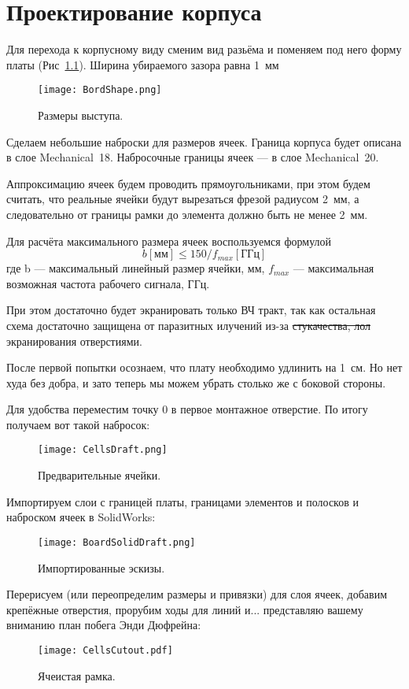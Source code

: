 \chapter{Проектирование корпуса}

Для перехода к корпусному виду сменим вид разьёма и поменяем под него форму платы (Рис~\ref{fig:BordShape}). Ширина убираемого зазора равна 1~мм

\begin{figure}[H]
	\centering
	\texttt{[image: BordShape.png]}
	\caption{Размеры выступа.}%
	\label{fig:BordShape}
\end{figure}

Сделаем небольшие наброски для размеров ячеек. 
Граница корпуса будет описана в слое Mechanical~18. Набросочные границы ячеек — в слое Mechanical~20.

Аппроксимацию ячеек будем проводить прямоугольниками, при этом будем считать, что реальные ячейки будут вырезаться фрезой радиусом 2~мм, а следовательно от границы рамки до элемента должно быть не менее 2~мм.

Для расчёта максимального размера ячеек воспользуемся формулой
\[b[\text{мм}]\leq150/f_{max}[\text{ГГц}]\]
где  b  ---  максимальный  линейный  размер  ячейки,  мм, $f_{max}$ ---  максимальная возможная частота рабочего сигнала, ГГц.

При этом достаточно будет экранировать только ВЧ тракт, так как остальная схема достаточно защищена от паразитных илучений из-за \sout{стукачества, лол} экранирования отверстиями. 

После первой попытки осознаем, что плату необходимо удлинить на 1~см. Но нет худа без добра, и зато теперь  мы можем убрать столько же с боковой стороны.

Для удобства переместим точку 0 в первое монтажное отверстие.
По итогу получаем вот такой набросок:
\begin{figure}[H]
	\centering
	\texttt{[image: CellsDraft.png]}
	\caption{Предварительные ячейки.}%
	\label{fig:CellsDraft}
\end{figure}

Импортируем слои с границей платы, границами элементов и полосков и наброском ячеек в SolidWorks:
\begin{figure}[H]
	\centering
	\texttt{[image: BoardSolidDraft.png]}
	\caption{Импортированные эскизы.}%
	\label{fig:BoardSolidDraft}
\end{figure}

Перерисуем (или переопределим размеры и привязки) для слоя ячеек, добавим крепёжные отверстия, прорубим ходы для линий и...  представляю вашему вниманию план побега Энди Дюфрейна:
\begin{figure}[H]
	\centering
	\texttt{[image: CellsCutout.pdf]}
	\caption{Ячеистая рамка.}%
	\label{fig:CellsCutout}
\end{figure} 

